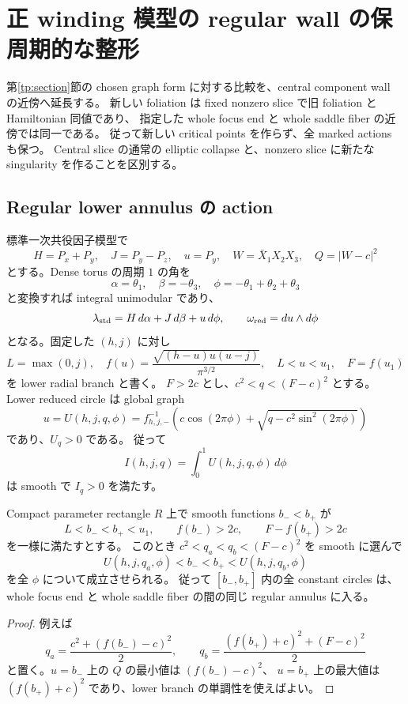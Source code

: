 \section{正 winding 模型の regular wall の保周期的な整形}
\label{we:section}

第\ref{tp:section}節の chosen graph form に対する比較を、central component wall の近傍へ延長する。
新しい foliation は fixed nonzero slice で旧 foliation と Hamiltonian 同値であり、
指定した whole focus end と whole saddle fiber の近傍では同一である。
従って新しい critical points を作らず、全 marked actions も保つ。
Central slice の通常の elliptic collapse と、nonzero slice に新たな singularity を作ることを区別する。

\subsection{Regular lower annulus の action}

標準一次共役因子模型で
\[
 H=P_x+P_y,\quad J=P_y-P_z,\quad u=P_y,\quad
 W=\bar X_1X_2X_3,\quad Q=|W-c|^2
\]
とする。Dense torus の周期 $1$ の角を
\[
 \alpha=\theta_1,\quad \beta=-\theta_3,\quad
 \phi=-\theta_1+\theta_2+\theta_3
\]
と変換すれば integral unimodular であり、
\begin{equation}\label{we:primitive}
 \lambda_{\rm std}=H\,d\alpha+J\,d\beta+u\,d\phi,\qquad
 \omega_{\rm red}=du\wedge d\phi
\end{equation}
となる。固定した $(h,j)$ に対し
\[
 L=\max(0,j),\quad
 f(u)=\frac{\sqrt{(h-u)u(u-j)}}{\pi^{3/2}},
 \quad L<u<u_1,\quad F=f(u_1)
\]
を lower radial branch と書く。
$F>2c$ とし、$c^2<q<(F-c)^2$ とする。
Lower reduced circle は global graph
\begin{equation}\label{we:graph}
 u=U(h,j,q,\phi)
 =f_{h,j,-}^{-1}\left(c\cos(2\pi\phi)
       +\sqrt{q-c^2\sin^2(2\pi\phi)}\right)
\end{equation}
であり、$U_q>0$ である。
従って
\begin{equation}\label{we:action}
 I(h,j,q)=\int_0^1U(h,j,q,\phi)\,d\phi
\end{equation}
は smooth で $I_q>0$ を満たす。

\begin{lemma}\label{we:annulus}
Compact parameter rectangle $R$ 上で smooth functions $b_-<b_+$ が
\[
 L<b_-<b_+<u_1,\qquad f(b_-)>2c,\qquad F-f(b_+)>2c
\]
を一様に満たすとする。
このとき $c^2<q_a<q_b<(F-c)^2$ を smooth に選んで
\[
 U(h,j,q_a,\phi)<b_-<b_+<U(h,j,q_b,\phi)
\]
を全 $\phi$ について成立させられる。
従って $[b_-,b_+]$ 内の全 constant circles は、
whole focus end と whole saddle fiber の間の同じ regular annulus に入る。
\end{lemma}
\begin{proof}
例えば
\[
 q_a=\frac{c^2+(f(b_-)-c)^2}{2},\qquad
 q_b=\frac{(f(b_+)+c)^2+(F-c)^2}{2}
\]
と置く。$u=b_-$ 上の $Q$ の最小値は $(f(b_-)-c)^2$、
$u=b_+$ 上の最大値は $(f(b_+)+c)^2$ であり、lower branch の単調性を使えばよい。
\end{proof}

